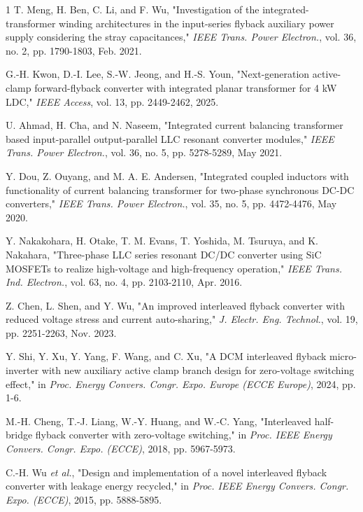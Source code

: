 \documentclass[lettersize,journal]{IEEEtran}
\begin{document}
\begin{thebibliography}{1}
T. Meng, H. Ben, C. Li, and F. Wu, "Investigation of the integrated-transformer winding architectures in the input-series flyback auxiliary power supply considering the stray capacitances," \textit{IEEE Trans. Power Electron.}, vol. 36, no. 2, pp. 1790-1803, Feb. 2021.

G.-H. Kwon, D.-I. Lee, S.-W. Jeong, and H.-S. Youn, "Next-generation active-clamp forward-flyback converter with integrated planar transformer for 4 kW LDC," \textit{IEEE Access}, vol. 13, pp. 2449-2462, 2025.

U. Ahmad, H. Cha, and N. Naseem, "Integrated current balancing transformer based input-parallel output-parallel LLC resonant converter modules," \textit{IEEE Trans. Power Electron.}, vol. 36, no. 5, pp. 5278-5289, May 2021.

Y. Dou, Z. Ouyang, and M. A. E. Andersen, "Integrated coupled inductors with functionality of current balancing transformer for two-phase synchronous DC-DC converters," \textit{IEEE Trans. Power Electron.}, vol. 35, no. 5, pp. 4472-4476, May 2020.

Y. Nakakohara, H. Otake, T. M. Evans, T. Yoshida, M. Tsuruya, and K. Nakahara, "Three-phase LLC series resonant DC/DC converter using SiC MOSFETs to realize high-voltage and high-frequency operation," \textit{IEEE Trans. Ind. Electron.}, vol. 63, no. 4, pp. 2103-2110, Apr. 2016.

Z. Chen, L. Shen, and Y. Wu, "An improved interleaved flyback converter with reduced voltage stress and current auto-sharing," \textit{J. Electr. Eng. Technol.}, vol. 19, pp. 2251-2263, Nov. 2023.

Y. Shi, Y. Xu, Y. Yang, F. Wang, and C. Xu, "A DCM interleaved flyback micro-inverter with new auxiliary active clamp branch design for zero-voltage switching effect," in \textit{Proc. Energy Convers. Congr. Expo. Europe (ECCE Europe)}, 2024, pp. 1-6.

M.-H. Cheng, T.-J. Liang, W.-Y. Huang, and W.-C. Yang, "Interleaved half-bridge flyback converter with zero-voltage switching," in \textit{Proc. IEEE Energy Convers. Congr. Expo. (ECCE)}, 2018, pp. 5967-5973.

C.-H. Wu \textit{et al.}, "Design and implementation of a novel interleaved flyback converter with leakage energy recycled," in \textit{Proc. IEEE Energy Convers. Congr. Expo. (ECCE)}, 2015, pp. 5888-5895.


\end{thebibliography}
\end{document}
